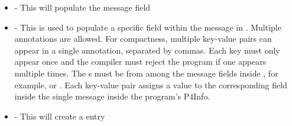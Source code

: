 \documentclass[11pt]{article}
\begin{document}
{\begin{itemize}
\item{}
 - This will populate the  message
field%

\item{}
 - This is used to populate a specific field within the
 message in . Multiple
 annotations are allowed. For compactness,
multiple key-value pairs can appear in a single 
annotation, separated by commas. Each key must only appear once and the
compiler must reject the program if one appears multiple times. The s
must be from among the message fields inside , for example,
 or . Each
key-value pair assigns a value to the corresponding field inside the single
 message inside the program's P4Info.%

\item{}
 - This will create a  entry%
\end{itemize}%

}
\end{document}
